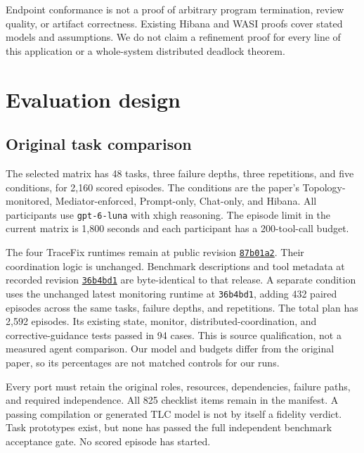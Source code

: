\documentclass[10pt]{article}
\begin{document}
Endpoint conformance is not a proof of arbitrary program termination, review
quality, or artifact correctness. Existing Hibana and WASI proofs cover stated
models and assumptions. We do not claim a refinement proof for every line of
this application or a whole-system distributed deadlock theorem.

\section{Evaluation design}
\subsection{Original task comparison}
The selected matrix has 48 tasks, three failure depths, three repetitions,
and five conditions, for 2,160 scored episodes. The conditions are the paper's
Topology-monitored, Mediator-enforced, Prompt-only, Chat-only, and Hibana.
All participants use \texttt{gpt-6-luna} with xhigh reasoning. The episode limit
in the current matrix is 1,800 seconds and each participant has a 200-tool-call budget.

The four TraceFix runtimes remain at public revision
\href{https://github.com/Sensing-And-Reasoning/TraceFix/tree/87b01a2c0ae53c5045c9ce3d43cd0235b1831275}{\texttt{87b01a2}}. Their coordination logic is
unchanged. Benchmark descriptions and tool metadata at recorded revision
\href{https://github.com/Sensing-And-Reasoning/TraceFix/tree/36b4bd108fcd74f7efb17613aebbe3fdf55499a9}{\texttt{36b4bd1}} are byte-identical to that
release. A separate condition uses the unchanged latest monitoring runtime at
\texttt{36b4bd1}, adding 432 paired episodes across the same tasks, failure
depths, and repetitions. The total plan has 2,592 episodes. Its existing state,
monitor, distributed-coordination, and corrective-guidance tests passed in 94
cases. This is source qualification, not a measured agent comparison.
Our model and budgets differ from the original paper, so its percentages are not
matched controls for our runs.

Every port must retain the original roles, resources, dependencies, failure
paths, and required independence. All 825 checklist items remain in the
manifest. A passing compilation or generated TLC model is not by itself a
fidelity verdict. Task prototypes exist, but none has passed the
full independent benchmark acceptance gate. No scored episode has started.
\end{document}
